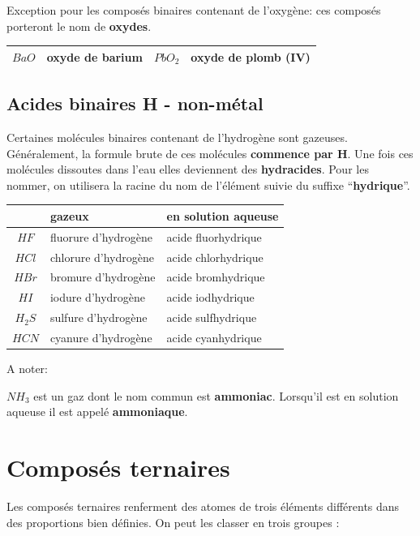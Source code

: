 \documentclass[
  11pt,
  a4paper,
  openany]{book}
\begin{document}
Exception pour les composés binaires contenant de l'oxygène: ces composés porteront le nom de \textbf{oxydes}.

\begin{longtable}[]{@{}clcl@{}}
\toprule()
\endhead
\(BaO\) & \textbf{oxyde} de barium & \(PbO_2\) & \textbf{oxyde} de plomb \textbf{(IV)} \\
\bottomrule()
\end{longtable}

\hypertarget{acides-binaires-h---non-muxe9tal}{%
\subsection{Acides binaires \textbar{} H - non-métal}\label{acides-binaires-h---non-muxe9tal}}

Certaines molécules binaires contenant de l'hydrogène sont gazeuses. Généralement, la formule brute de ces molécules \textbf{commence par H}. Une fois ces molécules dissoutes dans l'eau elles deviennent des \textbf{hydracides}. Pour les nommer, on utilisera la racine du nom de l'élément suivie du suffixe ``\textbf{hydrique}''.

\begin{longtable}[]{@{}cll@{}}
\toprule()
& gazeux & en solution aqueuse \\
\midrule()
\endhead
\(HF\) & fluorure d'hydrogène & acide fluorhydrique \\
\(HCl\) & chlorure d'hydrogène & acide chlorhydrique \\
\(HBr\) & bromure d'hydrogène & acide bromhydrique \\
\(HI\) & iodure d'hydrogène & acide iodhydrique \\
\(H_2S\) & sulfure d'hydrogène & acide sulfhydrique \\
\(HCN\) & cyanure d'hydrogène & acide cyanhydrique \\
\bottomrule()
\end{longtable}

A noter:

\(NH_3\) est un gaz dont le nom commun est \textbf{ammoniac}. Lorsqu'il est en solution aqueuse il est appelé \textbf{ammoniaque}.

\hypertarget{composuxe9s-ternaires}{%
\section{Composés ternaires}\label{composuxe9s-ternaires}}

Les composés ternaires renferment des atomes de trois éléments différents dans des proportions bien définies. On peut les classer en trois groupes :
\end{document}
